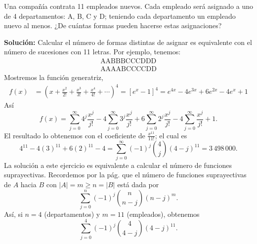 \begin{myexample}
    Una compañía contrata 11 empleados nuevos. Cada empleado será asignado a uno de 4 departamentos: A, B, C y D; teniendo cada departamento un empleado nuevo al menos. ¿De cuántas formas pueden hacerse estas asignaciones?

    \tcblower
    \textbf{\color{jblueleft}Solución:} Calcular el número de formas distintas de asignar es equivalente con el número de sucesiones con 11 letras. Por ejemplo, tenemos:
    $$\begin{array}{l}
        \text{AABBBCCCDDD} \\
        \text{AAAABCCCCDD}
    \end{array}$$
    Mostremos la función generatriz,
    \begin{align*}
        f(x) & = \left( x + \frac{x^{2}}{2!} + \frac{x^{3}}{3!} + \frac{x^{4}}{4!} + \cdots \right)^{4} = [e^{x} - 1]^{4} = e^{4x} - 4e^{3x} + 6e^{2x} - 4e^{x} + 1
    \end{align*}
    Así
    $$f(x)  = \sum_{j=0}^{\infty} 4^{j} \frac{x^{j}}{j!} - 4 \sum_{j=0}^{\infty} 3^{j} \frac{x^{j}}{j!} + 6 \sum_{j=0}^{\infty} 2^{j} \frac{x^{j}}{j!} - 4 \sum_{j=0}^{\infty} \frac{x^{j}}{j!} + 1.$$
    El resultado lo obtenemos con el coeficiente de $\displaystyle \frac{x^{11}}{11!}$; el cual es
    $$4^{11} - 4(3)^{11} + 6(2)^{11} - 4 = \sum_{j=0}^{\infty} (-1)^{j} \binom{4}{j} (4-j)^{11} = 3 \, 498 \, 000.$$
    La solución a este ejercicio es equivalente a calcular el número de funciones suprayectivas. Recordemos por la pág. \pageref{JEDHFHDJKHJFHGJGB} que el número de funciones suprayectivas de $A$ hacia $B$ con $|A| = m \geq n = |B|$ está dada por
    $$\sum_{j=0}^{n} (-1)^j \binom{n}{n-j} (n-j)^m.$$
    Así, si $n = 4$ (departamentos) y $m = 11$ (empleados), obtenemos
    $$\sum_{j=0}^{4} (-1)^j \binom{4}{4-j} (4-j)^{11}.$$
\end{myexample}